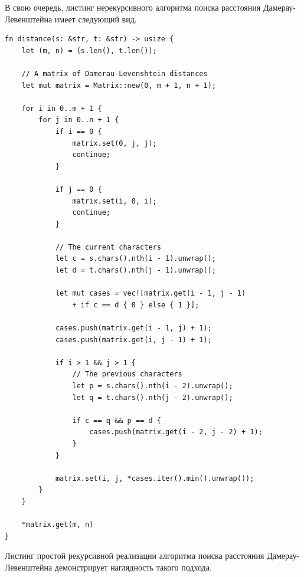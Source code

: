 \documentclass{report}
\begin{document}
В свою очередь, листинг нерекурсивного алгоритма поиска расстояния
Дамерау-Левенштейна имеет следующий вид.

\begin{lstlisting}[caption=
    Нерекурсивная реализация алгоритма поиска расстояния
    Дамерау-Левенштейна.
]
fn distance(s: &str, t: &str) -> usize {
    let (m, n) = (s.len(), t.len());

    // A matrix of Damerau-Levenshtein distances
    let mut matrix = Matrix::new(0, m + 1, n + 1);

    for i in 0..m + 1 {
        for j in 0..n + 1 {
            if i == 0 {
                matrix.set(0, j, j);
                continue;
            }

            if j == 0 {
                matrix.set(i, 0, i);
                continue;
            }

            // The current characters
            let c = s.chars().nth(i - 1).unwrap();
            let d = t.chars().nth(j - 1).unwrap();

            let mut cases = vec![matrix.get(i - 1, j - 1)
                + if c == d { 0 } else { 1 }];

            cases.push(matrix.get(i - 1, j) + 1);
            cases.push(matrix.get(i, j - 1) + 1);

            if i > 1 && j > 1 {
                // The previous characters
                let p = s.chars().nth(i - 2).unwrap();
                let q = t.chars().nth(j - 2).unwrap();

                if c == q && p == d {
                    cases.push(matrix.get(i - 2, j - 2) + 1);
                }
            }

            matrix.set(i, j, *cases.iter().min().unwrap());
        }
    }

    *matrix.get(m, n)
}
\end{lstlisting}

Листинг простой рекурсивной реализации алгоритма поиска расстояния
Дамерау-Левенштейна демонстрирует наглядность такого подхода.
\end{document}
